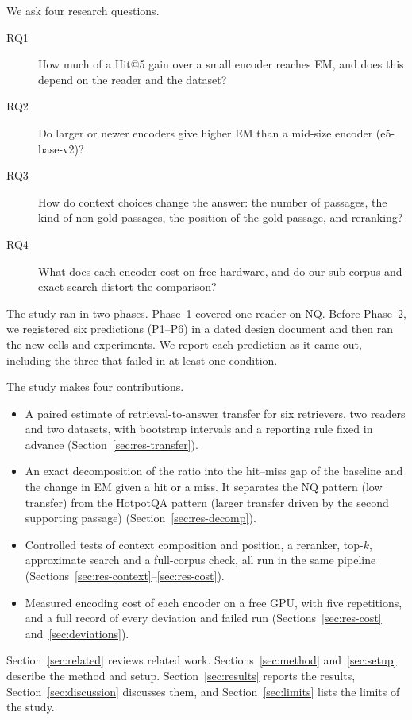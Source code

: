 We ask four research questions.
\begin{description}
\item[RQ1] How much of a Hit@5 gain over a small encoder reaches EM, and does this depend on the reader and the dataset?
\item[RQ2] Do larger or newer encoders give higher EM than a mid-size encoder (e5-base-v2)?
\item[RQ3] How do context choices change the answer: the number of passages, the kind of non-gold passages, the position of the gold passage, and reranking?
\item[RQ4] What does each encoder cost on free hardware, and do our sub-corpus and exact search distort the comparison?
\end{description}

The study ran in two phases. Phase~1 covered one reader on NQ. Before Phase~2, we registered six predictions (P1--P6) in a dated design document and then ran the new cells and experiments. We report each prediction as it came out, including the three that failed in at least one condition.

The study makes four contributions.
\begin{itemize}
\item A paired estimate of retrieval-to-answer transfer for six retrievers, two readers and two datasets, with bootstrap intervals and a reporting rule fixed in advance (Section~\ref{sec:res-transfer}).
\item An exact decomposition of the ratio into the hit--miss gap of the baseline and the change in EM given a hit or a miss. It separates the NQ pattern (low transfer) from the HotpotQA pattern (larger transfer driven by the second supporting passage) (Section~\ref{sec:res-decomp}).
\item Controlled tests of context composition and position, a reranker, top-$k$, approximate search and a full-corpus check, all run in the same pipeline (Sections~\ref{sec:res-context}--\ref{sec:res-cost}).
\item Measured encoding cost of each encoder on a free GPU, with five repetitions, and a full record of every deviation and failed run (Sections~\ref{sec:res-cost} and~\ref{sec:deviations}).
\end{itemize}

Section~\ref{sec:related} reviews related work. Sections~\ref{sec:method} and~\ref{sec:setup} describe the method and setup. Section~\ref{sec:results} reports the results, Section~\ref{sec:discussion} discusses them, and Section~\ref{sec:limits} lists the limits of the study.
